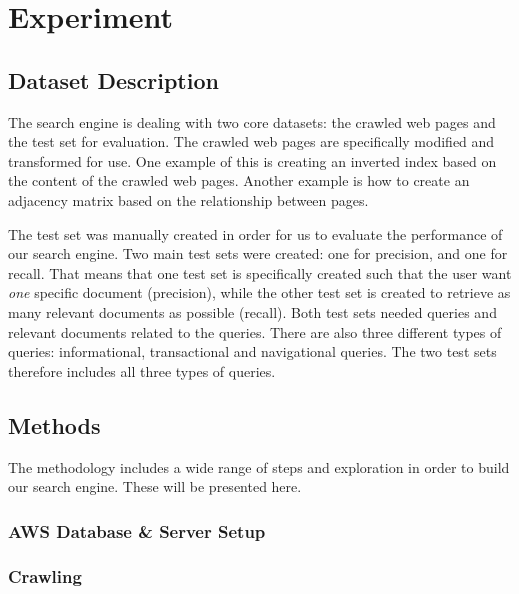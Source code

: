 

\section{Experiment} %
\label{sec:experiment}

\subsection{Dataset Description} %
\label{sub:dataset_description}

The search engine is dealing with two core datasets: the crawled web pages and the test set for evaluation. The crawled web pages are specifically modified and transformed for use. One example of this is creating an inverted index based on the content of the crawled web pages. Another example is how to create an adjacency matrix based on the relationship between pages.

The test set was manually created in order for us to evaluate the performance of our search engine. Two main test sets were created: one for precision, and one for recall. That means that one test set is specifically created such that the user want \emph{one} specific document (precision), while the other test set is created to retrieve as many relevant documents as possible (recall). Both test sets needed queries and relevant documents related to the queries. There are also three different types of queries: informational, transactional and navigational queries. The two test sets therefore includes all three types of queries.


\subsection{Methods} %
\label{sub:methods}
The methodology includes a wide range of steps and exploration in order to build our search engine. These will be presented here.

\subsubsection{AWS Database \& Server Setup} %
\label{ssub:database_and_server_setup}


\subsubsection{Crawling} %
\label{ssub:crawling}

